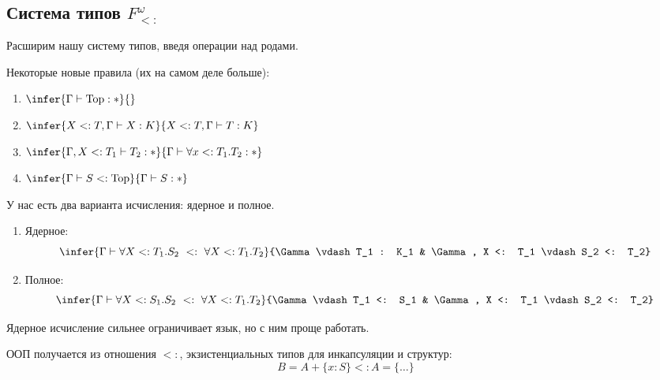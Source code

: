 \subsection{Система типов \(F_{<:}^\omega\)}

Расширим нашу систему типов, введя операции над родами.

Некоторые новые правила (их на самом деле больше):
\begin{enumerate}
    \item \(\infer{\Gamma \vdash \mathrm{Top} : *}{}\)
    \item \(\infer{X <: T, \Gamma \vdash X : K}{X <: T, \Gamma \vdash T : K}\)
    \item \(\infer{\Gamma, X <: T_1 \vdash T_2 : *}{\Gamma \vdash \forall x <: T_1 . T_2 : *}\)
    \item \(\infer{\Gamma \vdash S <: \mathrm{Top}}{\Gamma \vdash S : *}\)
\end{enumerate}

У нас есть два варианта исчисления: ядерное и полное.

\begin{enumerate}
    \item Ядерное:
          \[\infer{\Gamma \vdash \forall X <: T_1.S_2\ <:\ \forall X <: T_1.T_2}{\Gamma \vdash T_1 : K_1 & \Gamma, X <: T_1 \vdash S_2 <: T_2}\]
    \item Полное:
          \[\infer{\Gamma \vdash \forall X <: S_1.S_2\ <:\ \forall X <: T_1.T_2}{\Gamma \vdash T_1 <: S_1 & \Gamma, X <: T_1 \vdash S_2 <: T_2}\]
\end{enumerate}

Ядерное исчисление сильнее ограничивает язык, но с ним проще работать.

ООП получается из отношения \(<:\), экзистенциальных типов для инкапсуляции и структур:
\[B = A + \{x : S\} <: A = \{\ldots\}\]
